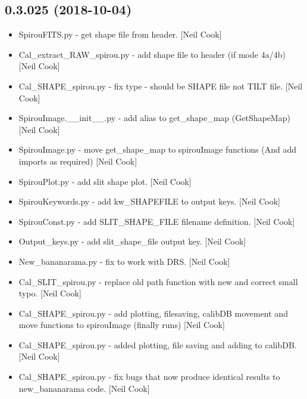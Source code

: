 \documentclass[a4paper,10pt,english]{report}
\begin{document}
\subsection{0.3.025 (2018-10-04)}
\label{\detokenize{misc/changelog:id305}}\begin{itemize}
\item {} 
SpirouFITS.py - get shape file from header. {[}Neil Cook{]}

\item {} 
Cal\_extract\_RAW\_spirou.py - add shape file to header (if mode 4a/4b)
{[}Neil Cook{]}

\item {} 
Cal\_SHAPE\_spirou.py - fix type - should be SHAPE file not TILT file.
{[}Neil Cook{]}

\item {} 
SpirouImage.\_\_init\_\_.py - add alias to get\_shape\_map (GetShapeMap)
{[}Neil Cook{]}

\item {} 
SpirouImage.py - move get\_shape\_map to spirouImage functions (And add
imports as required) {[}Neil Cook{]}

\item {} 
SpirouPlot.py - add slit shape plot. {[}Neil Cook{]}

\item {} 
SpirouKeywords.py - add kw\_SHAPEFILE to output keys. {[}Neil Cook{]}

\item {} 
SpirouConst.py - add SLIT\_SHAPE\_FILE filename definition. {[}Neil Cook{]}

\item {} 
Output\_keys.py - add slit\_shape\_file output key. {[}Neil Cook{]}

\item {} 
New\_bananarama.py - fix to work with DRS. {[}Neil Cook{]}

\item {} 
Cal\_SLIT\_spirou.py - replace old path function with new and correct
small typo. {[}Neil Cook{]}

\item {} 
Cal\_SHAPE\_spirou.py - add plotting, filesaving, calibDB movement and
move functions to spirouImage (finally runs) {[}Neil Cook{]}

\item {} 
Cal\_SHAPE\_spirou.py - added plotting, file saving and adding to
calibDB. {[}Neil Cook{]}

\item {} 
Cal\_SHAPE\_spirou.py - fix bugs that now produce identical results to
new\_bananarama code. {[}Neil Cook{]}

\end{itemize}
\end{document}
